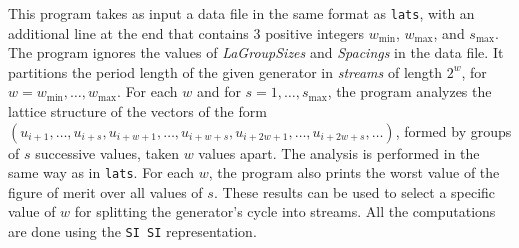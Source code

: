
This program takes as input a data file in the same format as
{\tt lats}, with an additional line at the end that contains 
3 positive integers $w_{\min}$, $w_{\max}$, and $s_{\max}$.
The program ignores the values of {\em LaGroupSizes\/} and 
{\em Spacings\/} in the data file.
It partitions the period length of the given generator
in {\em streams\/} of length $2^w$, for $w = w_{\min},\dots,w_{\max}$.
For each $w$ and for $s = 1,\dots,s_{\max}$, the program analyzes the
lattice structure of the vectors of the form 
$(u_{i+1}, \dots, u_{i+s}, u_{i+w+1},\dots, u_{i+w+s}, u_{i+2w+1},\dots,
u_{i+2w+s}, \dots)$, formed by groups of $s$ successive values,
taken $w$ values apart.
The analysis is performed in the same way as in {\tt lats}.
For each $w$, the program also prints the worst value of the figure 
of merit over all values of $s$.
These results can be used to select a specific value of $w$
for splitting the generator's cycle into streams.
All the computations are done using the {\tt SI SI} representation.











